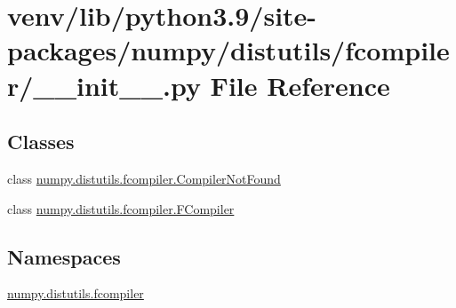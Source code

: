 \hypertarget{venv_2lib_2python3_89_2site-packages_2numpy_2distutils_2fcompiler_2____init_____8py}{}\section{venv/lib/python3.9/site-\/packages/numpy/distutils/fcompiler/\+\_\+\+\_\+init\+\_\+\+\_\+.py File Reference}
\label{venv_2lib_2python3_89_2site-packages_2numpy_2distutils_2fcompiler_2____init_____8py}
\subsection*{Classes}
\begin{DoxyCompactItemize}
\item 
class \hyperlink{classnumpy_1_1distutils_1_1fcompiler_1_1CompilerNotFound}{numpy.\+distutils.\+fcompiler.\+Compiler\+Not\+Found}
\item 
class \hyperlink{classnumpy_1_1distutils_1_1fcompiler_1_1FCompiler}{numpy.\+distutils.\+fcompiler.\+F\+Compiler}
\end{DoxyCompactItemize}
\subsection*{Namespaces}
\begin{DoxyCompactItemize}
\item 
 \hyperlink{namespacenumpy_1_1distutils_1_1fcompiler}{numpy.\+distutils.\+fcompiler}
\end{DoxyCompactItemize}
